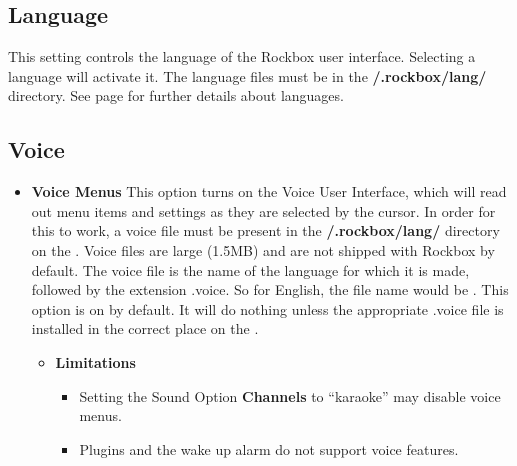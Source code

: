 \begin{itemize}
  \subsection{\label{ref:Language}Language}
  This setting controls the language of the Rockbox user interface. Selecting  a language will activate it. The language files must be in the \textbf{/.rockbox/lang/} directory. See page \pageref{ref:Loadinglanguages} for further details about languages.
  
  \subsection{Voice}
  
  \begin{itemize}
  \item \textbf{Voice Menus}
    This option turns on the Voice User Interface, which will read out menu items and settings as they are selected by the cursor.  In order for this to work, a voice file must be present in the \textbf{/.rockbox/lang/} directory on the \dap.  Voice files are large (1.5MB) and are not shipped with Rockbox by default.
    The voice file is the name of the language for which it is made, followed by the extension .voice.  So for English, the file name would be .
    This option is on by default.  It will do nothing unless the appropriate .voice file is installed in the correct place on the \dap.
    \begin{itemize}
    \item \textbf{Limitations}
      \begin{itemize}
      \item Setting the Sound Option \textbf{Channels} to ``karaoke'' may disable voice menus.
      \item Plugins and the wake up alarm do not support voice features.
      \end{itemize}
    \end{itemize}
    

\end{itemize}
\end{itemize}
